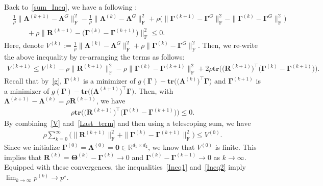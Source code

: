 \documentclass[alpha-refs]{wiley-article}
\begin{document}
Back to~\eqref{sum_Ineq}, we have a following :
\begin{align*}
    &\frac{1}{\rho} \| \boldsymbol{\Lambda}^{(k+1)} - \boldsymbol{\Lambda}^{G} \|_{\text{F}}^{2} - \frac{1}{\rho} \| \boldsymbol{\Lambda}^{(k)} - \boldsymbol{\Lambda}^{G} \|_{\text{F}}^{2}
    + \rho \bigg( \| \boldsymbol{\Gamma}^{(k+1)} - \boldsymbol{\Gamma}^{G} \|_{\text{F}}^{2}
    - \| \boldsymbol{\Gamma}^{(k)} - \boldsymbol{\Gamma}^{G} \|_{\text{F}}^{2} \bigg) \\
    &\qquad + \rho \| \boldsymbol{R}^{(k+1)} - \big( \boldsymbol{\Gamma}^{(k)} - \boldsymbol{\Gamma}^{(k+1)} \big) \|_{\text{F}}^{2} \leq 0.
\end{align*}
Here, denote $V^{(k)}:=\frac{1}{\rho} \| \boldsymbol{\Lambda}^{(k)} - \boldsymbol{\Lambda}^{G} \|_{\text{F}}^{2} + \rho \| \boldsymbol{\Gamma}^{(k)} - \boldsymbol{\Gamma}^{G} \|_{\text{F}}^{2}$.
Then, we re-write the above inequality by re-arranging the terms as follows:
\begin{align} \label{V}
    V^{(k+1)} \leq V^{(k)} - \rho \| \boldsymbol{R}^{(k+1)} \|_{\text{F}}^{2} - \rho \| \boldsymbol{\Gamma}^{(k)} - \boldsymbol{\Gamma}^{(k+1)} \|_{\text{F}}^{2} + 2 \rho \textbf{tr}\big( \big( \boldsymbol{R}^{(k+1)} \big)^{\top} \big( \boldsymbol{\Gamma}^{(k)} - \boldsymbol{\Gamma}^{(k+1)} \big)\big).
\end{align}
Recall that by~\eqref{g}, $\boldsymbol{\Gamma}^{(k)}$ is a minimizer of
$g(\boldsymbol{\Gamma}) - \textbf{tr} \big( \big( \boldsymbol{\Lambda}^{(k)}\big)^{\top} \boldsymbol{\Gamma} \big)$ and
$\boldsymbol{\Gamma}^{(k+1)}$ is a minimizer of
$g(\boldsymbol{\Gamma}) - \textbf{tr} \big( \big( \boldsymbol{\Lambda}^{(k+1)}\big)^{\top} \boldsymbol{\Gamma} \big)$.
Then, with $\boldsymbol{\Lambda}^{(k+1)}-\boldsymbol{\Lambda}^{(k)}=\rho\boldsymbol{R}^{(k+1)}$, we have
\begin{align} \label{Last_term}
    \rho\textbf{tr}\big(\big(\boldsymbol{R}^{(k+1)}\big)^{\top}\big(\boldsymbol{\Gamma}^{(k)}-\boldsymbol{\Gamma}^{(k+1)}\big)\big) \leq 0.
\end{align}
By combining~\eqref{V} and~\eqref{Last_term} and then using a telescoping sum, we have
\begin{align}
    \rho \sum_{k=0}^{\infty}\bigg( \| \boldsymbol{R}^{(k+1)} \|_{\text{F}}^{2} + \| \boldsymbol{\Gamma}^{(k)} - \boldsymbol{\Gamma}^{(k+1)} \|_{\text{F}}^{2} \bigg) \leq V^{(0)}.
\end{align}
Since we initialize $\boldsymbol{\Gamma}^{(0)}=\boldsymbol{\Lambda}^{(0)}=\boldsymbol{0} \in \mathbb{R}^{d_{1} \times d_{2}}$, we know that $V^{(0)}$ is finite.
This implies that $\boldsymbol{R}^{(k)}=\boldsymbol{\Theta}^{(k)}-\boldsymbol{\Gamma}^{(k)}\rightarrow{0}$ and $\boldsymbol{\Gamma}^{(k)} - \boldsymbol{\Gamma}^{(k+1)}\rightarrow{0}$ as $k\rightarrow{\infty}$.
Equipped with these convergences, the inequalities~\eqref{Ineq1} and~\eqref{Ineq2} imply $\lim_{k\rightarrow{\infty}}p^{(k)}\rightarrow{p^{\star}}$.
\end{document}
